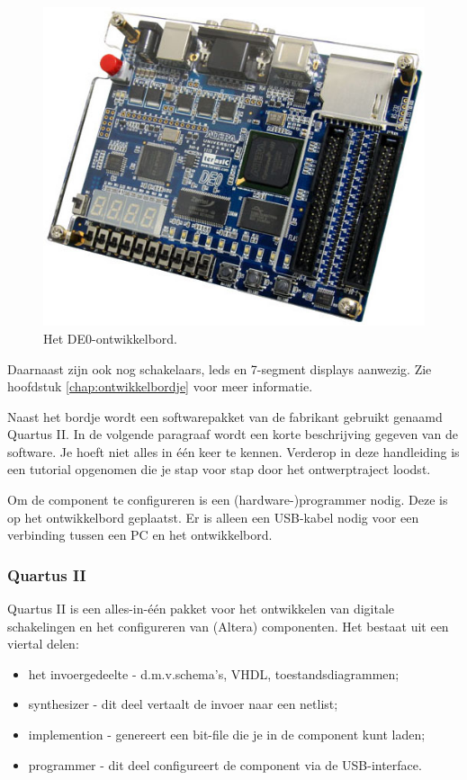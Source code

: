 \documentclass[a4paper,12pt,fleqn,twoside]{book}
\begin{document}
\begin{figure}[H]
\centering
\includegraphics[scale=0.63]{image-de0.jpg}
\caption{Het DE0-ontwikkelbord.}
\label{fig:image-de0}
\end{figure}
 
Daarnaast zijn ook nog schakelaars, leds en 7-segment displays aanwezig. Zie
hoofdstuk \ref{chap:ontwikkelbordje} voor meer informatie.

Naast het bordje wordt een softwarepakket van de fabrikant gebruikt genaamd
Quartus II. In de volgende paragraaf wordt een korte beschrijving gegeven van
de software. Je hoeft niet alles in \'{e}\'{e}n keer te kennen. Verderop in
deze handleiding is een tutorial opgenomen die je stap voor stap door het
ontwerptraject loodst.

Om de component te configureren is een (hardware-)programmer nodig. Deze is op
het ontwikkelbord geplaatst. Er is alleen een USB-kabel nodig voor een
verbinding tussen een PC en het ontwikkelbord.

\subsubsection{Quartus II}
Quartus II is een alles-in-\'{e}\'{e}n pakket voor het ontwikkelen van digitale
schakelingen en het configureren van (Altera) componenten. Het bestaat uit een
viertal delen:

\begin{itemize}\itemsep-1pt
\item het invoergedeelte - d.m.v.\@ schema's, VHDL, toestandsdiagrammen;
\item synthesizer - dit deel vertaalt de invoer naar een netlist;
\item implemention - genereert een bit-file die je in de component kunt laden;
\item programmer - dit deel configureert de component via de USB-interface.
\end{itemize}
\end{document}
